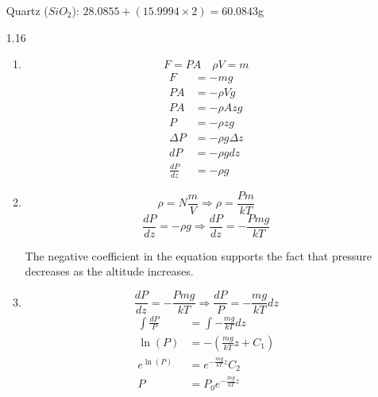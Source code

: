\documentclass{article}
\begin{document}
\begin{enumerate}
    Quartz (\(SiO_2\)): \(28.0855 + (15.9994 \times 2) = 60.0843\)g
    \vspace{0.1in}
    \item [1.16]
    \begin{enumerate}
        \item
            \begin{equation*}
                F = PA \quad \rho V = m    
            \end{equation*}
            \begin{align*}
                F &= -mg \\
                PA &= - \rho Vg \\
                PA &= - \rho Azg \\
                P &= - \rho zg \\
                \Delta P &= - \rho g \Delta z \\
                dP &= - \rho g dz \\
                \frac{dP}{dz} &= - \rho g
            \end{align*}
        \vspace{0.05in}
        \item
            \begin{equation*}
                \rho = N \frac{m}{V} \Rightarrow \rho = \frac{Pm}{kT}
            \end{equation*}
            \begin{equation*}
                \frac{dP}{dz} = - \rho g \Rightarrow \frac{dP}{dz} = - \frac{Pmg}{kT}
            \end{equation*}
                        
            The negative coefficient in the equation supports the fact that pressure decreases as the altitude increases.
        \vspace{0.05in}
        \item
            \begin{equation*}
                \frac{dP}{dz} = - \frac{Pmg}{kT} \Rightarrow \frac{dP}{P} = - \frac{mg}{kT} dz
            \end{equation*}
            \begin{align*}
                \int \frac{dP}{P} &= \int - \frac{mg}{kT} dz \\
                \ln (P) &= - \left(\frac{mg}{kT} z + C_1 \right) \\
                e^{\ln (P)} &= e^{- \frac{mg}{kT}z} C_2 \\
                P &= P_0 e^{- \frac{mg}{kT}z}
            \end{align*}


\end{enumerate}
\end{enumerate}
\end{document}
